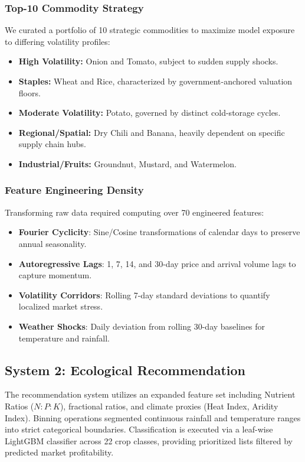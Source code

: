 \documentclass[conference]{IEEEtran}
\begin{document}
\subsubsection{Top-10 Commodity Strategy}
We curated a portfolio of 10 strategic commodities to maximize model exposure to differing volatility profiles:
\begin{itemize}
    \item \textbf{High Volatility:} Onion and Tomato, subject to sudden supply shocks.
    \item \textbf{Staples:} Wheat and Rice, characterized by government-anchored valuation floors.
    \item \textbf{Moderate Volatility:} Potato, governed by distinct cold-storage cycles.
    \item \textbf{Regional/Spatial:} Dry Chili and Banana, heavily dependent on specific supply chain hubs.
    \item \textbf{Industrial/Fruits:} Groundnut, Mustard, and Watermelon.
\end{itemize}

\subsubsection{Feature Engineering Density}
Transforming raw data required computing over 70 engineered features:
\begin{itemize}
    \item \textbf{Fourier Cyclicity}: Sine/Cosine transformations of calendar days to preserve annual seasonality.
    \item \textbf{Autoregressive Lags}: 1, 7, 14, and 30-day price and arrival volume lags to capture momentum.
    \item \textbf{Volatility Corridors}: Rolling 7-day standard deviations to quantify localized market stress.
    \item \textbf{Weather Shocks}: Daily deviation from rolling 30-day baselines for temperature and rainfall.
\end{itemize}

\subsection{System 2: Ecological Recommendation}
The recommendation system utilizes an expanded feature set including Nutrient Ratios ($N:P:K$), fractional ratios, and climate proxies (Heat Index, Aridity Index). Binning operations segmented continuous rainfall and temperature ranges into strict categorical boundaries. Classification is executed via a leaf-wise LightGBM classifier across 22 crop classes, providing prioritized lists filtered by predicted market profitability.
\end{document}

